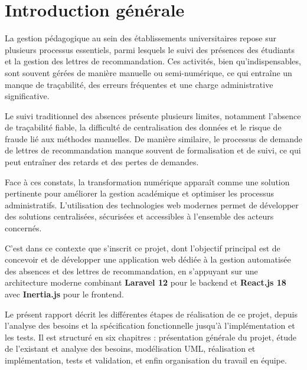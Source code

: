 \documentclass[12pt, a4paper, openright]{report}
\begin{document}
\cleardoublepage
{}
\setcounter{page}{1}

\chapter*{Introduction générale}
\thispagestyle{fancy}

La gestion pédagogique au sein des établissements universitaires repose sur plusieurs processus essentiels, parmi lesquels le suivi des présences des étudiants et la gestion des lettres de recommandation. Ces activités, bien qu'indispensables, sont souvent gérées de manière manuelle ou semi-numérique, ce qui entraîne un manque de traçabilité, des erreurs fréquentes et une charge administrative significative.

Le suivi traditionnel des absences présente plusieurs limites, notamment l'absence de traçabilité fiable, la difficulté de centralisation des données et le risque de fraude lié aux méthodes manuelles. De manière similaire, le processus de demande de lettres de recommandation manque souvent de formalisation et de suivi, ce qui peut entraîner des retards et des pertes de demandes.

Face à ces constats, la transformation numérique apparaît comme une solution pertinente pour améliorer la gestion académique et optimiser les processus administratifs. L'utilisation des technologies web modernes permet de développer des solutions centralisées, sécurisées et accessibles à l'ensemble des acteurs concernés.

C'est dans ce contexte que s'inscrit ce projet, dont l'objectif principal est de concevoir et de développer une application web dédiée à la gestion automatisée des absences et des lettres de recommandation, en s'appuyant sur une architecture moderne combinant \textbf{Laravel 12} pour le backend et \textbf{React.js 18} avec \textbf{Inertia.js} pour le frontend.

Le présent rapport décrit les différentes étapes de réalisation de ce projet, depuis l'analyse des besoins et la spécification fonctionnelle jusqu'à l'implémentation et les tests. Il est structuré en six chapitres : présentation générale du projet, étude de l'existant et analyse des besoins, modélisation UML, réalisation et implémentation, tests et validation, et enfin organisation du travail en équipe.
\end{document}
